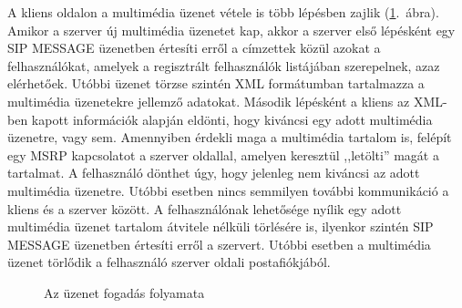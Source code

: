 A kliens oldalon a multimédia üzenet vétele is több lépésben zajlik (\ref{fig:receiving_proc}.~ábra). Amikor a szerver új multimédia üzenetet kap, akkor a szerver első lépésként egy SIP MESSAGE üzenetben értesíti erről a címzettek közül azokat a felhasználókat, amelyek a regisztrált felhasználók listájában szerepelnek, azaz elérhetőek. Utóbbi üzenet törzse szintén XML formátumban tartalmazza a multimédia üzenetekre jellemző adatokat. Második lépésként a kliens az XML-ben kapott információk alapján eldönti, hogy kiváncsi egy adott multimédia üzenetre, vagy sem. Amennyiben érdekli maga a multimédia tartalom is, felépít egy MSRP kapcsolatot a szerver oldallal, amelyen keresztül ,,letölti'' magát a tartalmat. A felhasználó dönthet úgy, hogy jelenleg nem kiváncsi az adott multimédia üzenetre. Utóbbi esetben nincs semmilyen további kommunikáció a kliens és a szerver között. A felhasználónak lehetősége nyílik egy adott multimédia üzenet tartalom átvitele nélküli törlésére is, ilyenkor szintén SIP MESSAGE üzenetben értesíti erről a szervert. Utóbbi esetben a multimédia üzenet törlődik a felhasználó szerver oldali postafiókjából.

\begin{figure}[htbp]
\center
{}
\caption{Az üzenet fogadás folyamata}
\label{fig:receiving_proc}
\end{figure}

